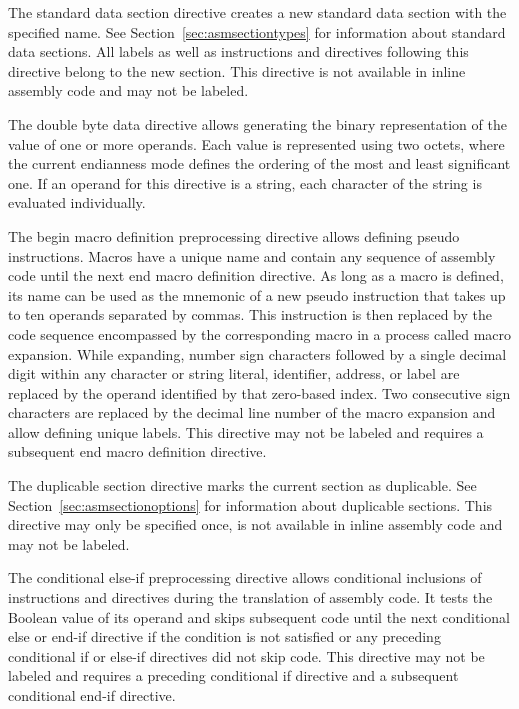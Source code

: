 The standard data section directive creates a new standard data section with the specified name.
See Section~\ref{sec:asmsectiontypes} for information about standard data sections.
All labels as well as instructions and directives following this directive belong to the new section.
This directive is not available in inline assembly code and may not be labeled.


The double byte data directive allows generating the binary representation of the value of one or more operands.
Each value is represented using two octets, where the current endianness mode defines the ordering of the most and least significant one.
If an operand for this directive is a string, each character of the string is evaluated individually.


The begin macro definition preprocessing directive allows defining pseudo instructions.
Macros have a unique name and contain any sequence of assembly code until the next end macro definition directive.
As long as a macro is defined, its name can be used as the mnemonic of a new pseudo instruction that takes up to ten operands separated by commas.
This instruction is then replaced by the code sequence encompassed by the corresponding macro in a process called macro expansion.
While expanding, number sign characters followed by a single decimal digit within any character or string literal, identifier, address, or label are replaced by the operand identified by that zero-based index.
Two consecutive sign characters are replaced by the decimal line number of the macro expansion and allow defining unique labels.
This directive may not be labeled and requires a subsequent end macro definition directive.


The duplicable section directive marks the current section as duplicable.
See Section~\ref{sec:asmsectionoptions} for information about duplicable sections.
This directive may only be specified once, is not available in inline assembly code and may not be labeled.


The conditional else-if preprocessing directive allows conditional inclusions of instructions and directives during the translation of assembly code.
It tests the Boolean value of its operand and skips subsequent code until the next conditional else or end-if directive
if the condition is not satisfied or any preceding conditional if or else-if directives did not skip code.
This directive may not be labeled and requires a preceding conditional if directive and a subsequent conditional end-if directive.


